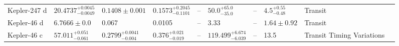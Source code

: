 \begin{tabular}{llllllllll}
Kepler-247 d & $20.4737^{+0.0045}_{-0.0049}$ & $0.1408 \pm 0.001$ & $0.1573^{+0.2045}_{-0.1101}$ & -- & $50.0^{+65.0}_{-35.0}$ & -- & $4.5^{+0.55}_{-0.48}$ & Transit & \cite{NESVORNY_ET_AL_2014} \\
Kepler-46 d & $6.7666 \pm 0.0$ & 0.067 & 0.0105 & -- & 3.33 & -- & $1.64 \pm 0.92$ & Transit & \cite{ROWE_ET_AL__2014} \\
Kepler-46 c & $57.011^{+0.051}_{-0.061}$ & $0.2799^{+0.0041}_{-0.004}$ & $0.376^{+0.021}_{-0.019}$ & -- & $119.499^{+6.674}_{-6.039}$ & -- & 13.5 & Transit Timing Variations & \cite{NESVORNY_ET_AL_2012} \\
\bottomrule
\end{tabular}
